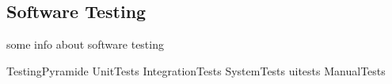 \subsection{Software Testing}

some info about software testing

{TestingPyramide}
{UnitTests}
{IntegrationTests}
{SystemTests}
{uitests}
{ManualTests}